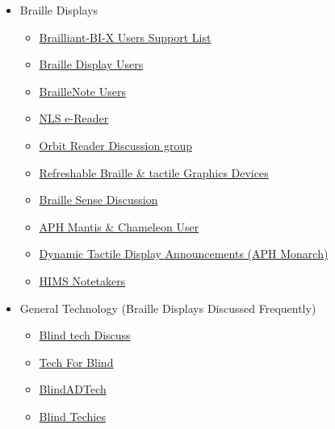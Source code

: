 \begin{itemize}[leftmargin=*]
 \item Braille Displays
 \begin{itemize}[leftmargin=2em]
 \item \href{http://groups.io/g/Brailliant-BI-X-USERS/}{Brailliant-BI-X Users Support List}
 \item \href{http://groups.io/g/braille-display-users}{Braille Display Users} 
 \item \href{http://groups.io/g/braillenote}{BrailleNote Users} 
 \item \href{http://groups.io/g/nlsEReader/messages}{NLS e-Reader} 
 \item \href{http://groups.io/g/orbit-reader}{Orbit Reader Discussion group} 
 \item \href{http://www.freelists.org/list/braillecell}{Refreshable Braille \& tactile Graphics Devices} 
 \item \href{http://www.freelists.org/list/braille-sense}{Braille Sense Discussion} 
 \item \href{http://www.freelists.org/list/aphmantischameleonuser}{APH Mantis \& Chameleon User} 
 \item \href{http://www.freelists.org/list/aph\_dynamictactiledisplay\_announce}{Dynamic Tactile Display Announcements (APH Monarch)} 
 \item \href{http://groups.io/g/hims-notetakers-chat}{HIMS Notetakers} 
 \end{itemize}
 \item General Technology (Braille Displays Discussed Frequently)
 \begin{itemize}[leftmargin=2em]
 \item \href{http://groups.io/g/blindtechdiscuss/messages}{Blind tech Discuss} 
 \item \href{http://groups.io/g/tech-for-blind}{Tech For Blind} 
 \item \href{http://groups.io/g/blindadtech}{BlindADTech} 
 \item \href{http://groups.io/g/blind-techies/messages}{Blind Techies} 
 \end{itemize}
\end{itemize}